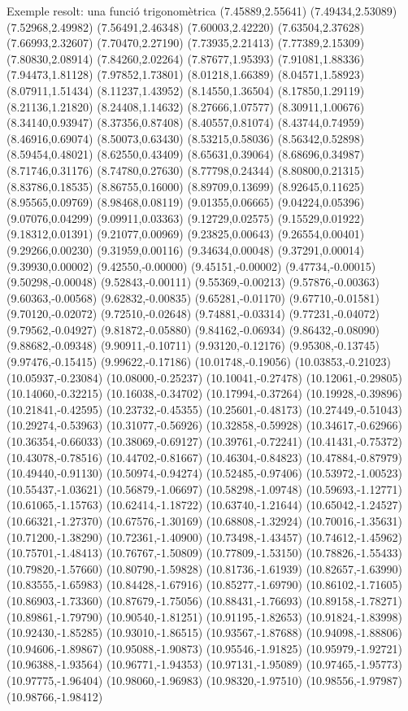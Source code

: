 \documentclass[11pt,a4paper]{article}
\begin{document}
\begin{fmex}{Exemple resolt: una funció trigonomètrica}
(7.45889,2.55641) (7.49434,2.53089) (7.52968,2.49982) (7.56491,2.46348) (7.60003,2.42220) (7.63504,2.37628) (7.66993,2.32607) (7.70470,2.27190) (7.73935,2.21413) (7.77389,2.15309) (7.80830,2.08914) (7.84260,2.02264) (7.87677,1.95393) (7.91081,1.88336) (7.94473,1.81128) (7.97852,1.73801) (8.01218,1.66389) (8.04571,1.58923) (8.07911,1.51434) (8.11237,1.43952) (8.14550,1.36504) (8.17850,1.29119) (8.21136,1.21820) (8.24408,1.14632) (8.27666,1.07577) (8.30911,1.00676) (8.34140,0.93947) (8.37356,0.87408) (8.40557,0.81074) (8.43744,0.74959) (8.46916,0.69074) (8.50073,0.63430) (8.53215,0.58036) (8.56342,0.52898) (8.59454,0.48021) (8.62550,0.43409) (8.65631,0.39064) (8.68696,0.34987) (8.71746,0.31176) (8.74780,0.27630) (8.77798,0.24344) (8.80800,0.21315) (8.83786,0.18535) (8.86755,0.16000) (8.89709,0.13699) (8.92645,0.11625) (8.95565,0.09769) (8.98468,0.08119) (9.01355,0.06665) (9.04224,0.05396) (9.07076,0.04299) (9.09911,0.03363) (9.12729,0.02575) (9.15529,0.01922) (9.18312,0.01391) (9.21077,0.00969) (9.23825,0.00643) (9.26554,0.00401) (9.29266,0.00230) (9.31959,0.00116) (9.34634,0.00048) (9.37291,0.00014) (9.39930,0.00002) (9.42550,-0.00000) (9.45151,-0.00002) (9.47734,-0.00015) (9.50298,-0.00048) (9.52843,-0.00111) (9.55369,-0.00213) (9.57876,-0.00363) (9.60363,-0.00568) (9.62832,-0.00835) (9.65281,-0.01170) (9.67710,-0.01581) (9.70120,-0.02072) (9.72510,-0.02648) (9.74881,-0.03314) (9.77231,-0.04072) (9.79562,-0.04927) (9.81872,-0.05880) (9.84162,-0.06934) (9.86432,-0.08090) (9.88682,-0.09348) (9.90911,-0.10711) (9.93120,-0.12176) (9.95308,-0.13745) (9.97476,-0.15415) (9.99622,-0.17186) (10.01748,-0.19056) (10.03853,-0.21023) (10.05937,-0.23084) (10.08000,-0.25237) (10.10041,-0.27478) (10.12061,-0.29805) (10.14060,-0.32215) (10.16038,-0.34702) (10.17994,-0.37264) (10.19928,-0.39896) (10.21841,-0.42595) (10.23732,-0.45355) (10.25601,-0.48173) (10.27449,-0.51043) (10.29274,-0.53963) (10.31077,-0.56926) (10.32858,-0.59928) (10.34617,-0.62966) (10.36354,-0.66033) (10.38069,-0.69127) (10.39761,-0.72241) (10.41431,-0.75372) (10.43078,-0.78516) (10.44702,-0.81667) (10.46304,-0.84823) (10.47884,-0.87979) (10.49440,-0.91130) (10.50974,-0.94274) (10.52485,-0.97406) (10.53972,-1.00523) (10.55437,-1.03621) (10.56879,-1.06697) (10.58298,-1.09748) (10.59693,-1.12771) (10.61065,-1.15763) (10.62414,-1.18722) (10.63740,-1.21644) (10.65042,-1.24527) (10.66321,-1.27370) (10.67576,-1.30169) (10.68808,-1.32924) (10.70016,-1.35631) (10.71200,-1.38290) (10.72361,-1.40900) (10.73498,-1.43457) (10.74612,-1.45962) (10.75701,-1.48413) (10.76767,-1.50809) (10.77809,-1.53150) (10.78826,-1.55433) (10.79820,-1.57660) (10.80790,-1.59828) (10.81736,-1.61939) (10.82657,-1.63990) (10.83555,-1.65983) (10.84428,-1.67916) (10.85277,-1.69790) (10.86102,-1.71605) (10.86903,-1.73360) (10.87679,-1.75056) (10.88431,-1.76693) (10.89158,-1.78271) (10.89861,-1.79790) (10.90540,-1.81251) (10.91195,-1.82653) (10.91824,-1.83998) (10.92430,-1.85285) (10.93010,-1.86515) (10.93567,-1.87688) (10.94098,-1.88806) (10.94606,-1.89867) (10.95088,-1.90873) (10.95546,-1.91825) (10.95979,-1.92721) (10.96388,-1.93564) (10.96771,-1.94353) (10.97131,-1.95089) (10.97465,-1.95773) (10.97775,-1.96404) (10.98060,-1.96983) (10.98320,-1.97510) (10.98556,-1.97987) (10.98766,-1.98412) 
\end{fmex}
\end{document}
